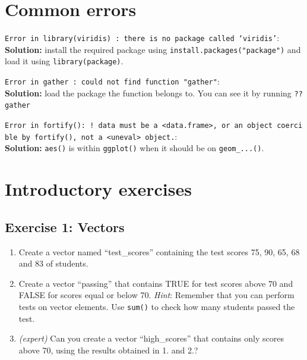\documentclass[
]{book}
\begin{document}
\hypertarget{common-errors}{%
\section*{Common errors}\label{common-errors}}

\texttt{Error\ in\ library(viridis)\ :\ there\ is\ no\ package\ called\ ‘viridis’}:\\
\textbf{Solution:} install the required package using \texttt{install.packages("package")} and load it using \texttt{library(package)}.

\texttt{Error\ in\ gather\ :\ could\ not\ find\ function\ "gather"}:\\
\textbf{Solution:} load the package the function belongs to.
You can see it by running \texttt{??gather}

\texttt{Error\ in\ fortify():\ !\ data\ must\ be\ a\ \textless{}data.frame\textgreater{},\ or\ an\ object\ coercible\ by\ fortify(),\ not\ a\ \textless{}uneval\textgreater{}\ object.}:\\
\textbf{Solution:} \texttt{aes()} is within \texttt{ggplot()} when it should be on \texttt{geom\_...()}.

\hypertarget{introductory-exercises}{%
\section*{Introductory exercises}\label{introductory-exercises}}

\hypertarget{exercise-1-vectors}{%
\subsection*{Exercise 1: Vectors}\label{exercise-1-vectors}}

\begin{enumerate}
\def\labelenumi{\arabic{enumi}.}
\item
  Create a vector named ``test\_scores'' containing the test scores 75, 90, 65, 68 and 83 of students.
\item
  Create a vector ``passing'' that contains TRUE for test scores above 70 and FALSE for scores equal or below 70.
  \emph{Hint}: Remember that you can perform tests on vector elements.
  Use \texttt{sum()} to check how many students passed the test.
\item
  \emph{(expert)} Can you create a vector ``high\_scores'' that contains only scores above 70, using the results obtained in 1.
  and 2.?
\end{enumerate}
\end{document}
